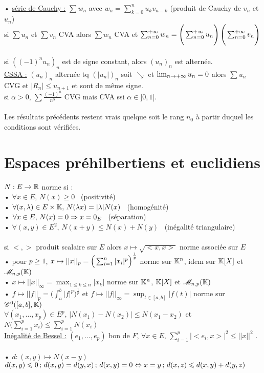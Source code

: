 \documentclass[12 pt]{exampleclass}
\begin{document}
\newpage
\text{}\\
• \underline{série de Cauchy :} $\sum w_n$ avec $w_n = \sum_{k=0}^n u_k v_{n-k}$ (produit de Cauchy de $v_n$ et $u_n$)\\
si $\sum u_n$ et $\sum v_n$ CVA alors $\sum w_n$ CVA et $\sum_{n=0}^{+\infty} w_n = \Bigg(\sum_{n=0}^{+\infty} u_n\Bigg) \, \Bigg( \sum_{n=0}^{+\infty} v_n \Bigg)$\\
\text{}\\
si $((-1)^n u_n)_n$ est de signe constant, alors $(u_n)_n$ est alternée.\\ 
\underline{CSSA :} $(u_n)_n$ alternée tq $(|u_n|)_n$ soit $\searrow$ et $\lim_{n\to +\infty} u_n = 0$ alors $\sum u_n$ CVG et $|R_n| \leqslant u_{n+1}$ et sont de même signe.\\
si $\alpha > 0$, $\sum \frac{(-1)^n}{n^\alpha}$ CVG mais CVA ssi $\alpha \in ]0,1]$.\\
\text{}\\
Les résultats précédents restent vrais quelque soit le rang $n_0$ à partir duquel les conditions sont vérifiées.\\

\section{Espaces préhilbertiens et euclidiens}
$N : E \to \mathbb{R}$ norme si :\\
• $\forall x\in E,\, N(x)\geqslant 0$ \ (positivité)\\
• $\forall (x,\lambda)\in E\times \mathbb{K},\, N(\lambda x) = |\lambda| N(x)$ \ (homogénité)\\
• $\forall x\in E,\, N(x) = 0 \Rightarrow x=0_E$ \ (séparation)\\
• $\forall (x,y)\in E^2,\, N(x+y)\leqslant N(x) + N(y)$ \ (inégalité triangulaire)\\
\text{}\\
si $<, >$ produit scalaire sur $E$ alors $x \mapsto \sqrt{<x, x>}$ norme associée sur $E$\\
• pour $p\geqslant 1$, $x\mapsto || x ||_p = \Big( \sum_{i=1}^n |x_i|^p \Big)^{\frac{1}{p}}$ \; norme sur $\mathbb{K}^n$, idem sur $\mathbb{K}[X]$ et $\mathscr{M}_{n,p}(\mathbb{K})$\\
• $x\mapsto || x ||_\infty = \max_{1\leqslant k \leqslant n} { |x_k|}$ norme sur $\mathbb{K}^n$, $\mathbb{K}[X]$ et $\mathscr{M}_{n,p}(\mathbb{K})$\\
• $f \mapsto ||f||_p = \Big( \int_a^b |f|^p \Big)^{\frac{1}{p}}$ et $f \mapsto ||f||_\infty = \sup_{t\in[a,b]} |f(t)|$ norme sur $\mathscr{C}^0([a,b],\mathbb{K})$\\
$\forall (x_1,\dots, x_p)\in E^p$, $|N(x_1) - N(x_2)| \leqslant N(x_1 - x_2)$ \; et \; $N\Big(\sum_{i=1}^p x_i \Big) \leqslant \sum_{i=1}^p N(x_i)$\\
\underline{Inégalité de Bessel :} $(e_1,\dots, e_p)$ bon de $F$, $\forall x\in E, \, \sum_{i =1}^p |<e_i,x>|^2 \leqslant ||x||^2$ .\\
\text{}\\
• $d : (x,y) \mapsto N(x-y)$\\
$d(x,y) \leqslant 0 \, ; \, d(x,y) = d(y,x) \, ; \, d(x,y)=0 \Leftrightarrow x=y \, ; \, d(x,z)\leqslant d(x,y) + d(y,z)$\\
\end{document}
